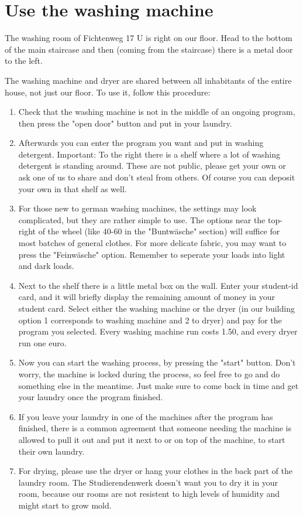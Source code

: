 \section{Use the washing machine}
The washing room of Fichtenweg 17 U is right on our floor. Head to the bottom of the main staircase and then (coming from the staircase) there is a metal door to the left.

The washing machine and dryer are shared between all inhabitants of the entire house, not just our floor. To use it, follow this procedure:
\begin{enumerate}
    \item Check that the washing machine is not in the middle of an ongoing program, then press the "open door" button and put in your laundry.
    
    \item Afterwards you can enter the program you want and put in washing detergent. Important: To the right there is a shelf where a lot of washing detergent is standing around. These are not public, please get your own or ask one of us to share and don't steal from others. Of course you can deposit your own in that shelf as well. 
    
    \item For those new to german washing machines, the settings may look complicated, but they are rather simple to use. The options near the top-right of the wheel (like 40-60 in the "Buntwäsche" section) will suffice for most batches of  general clothes. For more delicate fabric, you may want to press the "Feinwäsche" option. Remember to seperate your loads into light and dark loads.
    
    \item Next to the shelf there is a little metal box on the wall. Enter your student-id card, and it will briefly display the remaining amount of money in your student card. Select either the washing machine or the dryer (in our building option 1 corresponds to washing machine and 2 to dryer) and pay for the program you selected. Every washing machine run costs 1.50, and every dryer run one euro.
    
    \item Now you can start the washing process, by pressing the "start" button. Don't worry, the machine is locked during the process, so feel free to go and do something else in the meantime. Just make sure to come back in time and get your laundry once the program finished.
    
    \item If you leave your laundry in one of the machines after the program has finished, there is a common agreement that someone needing the machine is allowed to pull it out and put it next to or on top of the machine, to start their own laundry.
    
    \item For drying, please use the dryer or hang your clothes in the back part of the laundry room. The Studierendenwerk doesn't want you to dry it in your room, because our rooms are not resistent to high levels of humidity and might start to grow mold.
\end{enumerate}

